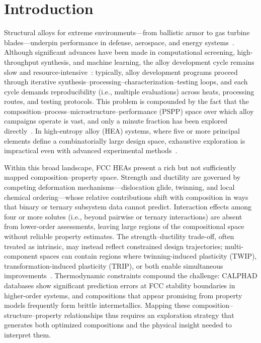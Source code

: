 \section{Introduction}\label{sec:Intro}


Structural alloys for extreme environments---from ballistic armor to gas turbine blades---underpin performance in defense, aerospace, and energy systems~\cite{pollock2016alloy, reed2006superalloys, arroyave2022perspective}. Although significant advances have been made in computational screening, high-throughput synthesis, and machine learning, the alloy development cycle remains slow and resource-intensive~\cite{liu2022highthroughput}: typically, alloy development programs proceed through iterative synthesis--processing--characterization--testing loops, and each cycle demands reproducibility (i.e., multiple evaluations) across heats, processing routes, and testing protocols. This problem is compounded by the fact that the composition--process--microstructure--performance (PSPP) space over which alloy campaigns operate is vast, and only a minute fraction has been explored directly~\cite{miracle2017critical}. In high-entropy alloy (HEA) systems, where five or more principal elements define a combinatorially large design space, exhaustive exploration is impractical even with advanced experimental methods~\cite{zhang2014microstructures, cantor2004microstructural}.


Within this broad landscape, FCC HEAs present a rich but not sufficiently mapped composition--property space. Strength and ductility are governed by competing deformation mechanisms---dislocation glide, twinning, and local chemical ordering---whose relative contributions shift with composition in ways that binary or ternary subsystem data cannot predict. Interaction effects among four or more solutes (i.e., beyond pairwise or ternary interactions) are absent from lower-order assessments, leaving large regions of the compositional space without reliable property estimates. The strength--ductility trade-off, often treated as intrinsic, may instead reflect constrained design trajectories; multi-component spaces can contain regions where twinning-induced plasticity (TWIP), transformation-induced plasticity (TRIP), or both enable simultaneous improvements~\cite{gludovatz2014fracture, li2016metastable, otto2013influences}. Thermodynamic constraints compound the challenge: CALPHAD databases show significant prediction errors at FCC stability boundaries in higher-order systems, and compositions that appear promising from property models frequently form brittle intermetallics. Mapping these composition--structure--property relationships thus requires an exploration strategy that generates both optimized compositions and the physical insight needed to interpret them.

